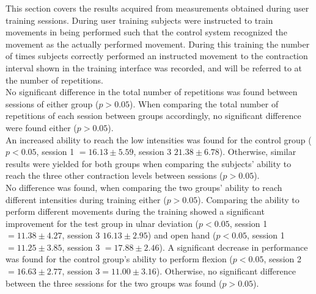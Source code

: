 \begin{multicols}{2}
This section covers the results acquired from measurements obtained during user training sessions. During user training subjects were instructed to train movements in being performed such that the control system recognized the movement as the actually performed movement. During this training the number of times subjects correctly performed an instructed movement to the contraction interval shown in the training interface was recorded, and will be referred to at the number of repetitions. \\
No significant difference in the total number of repetitions was found between sessions of either group ($p > 0.05$). When comparing the total number of repetitions of each session between groups accordingly, no significant difference were found either ($p > 0.05$). \\ %
An increased ability to reach the low intensities was found for the control group ($p < 0.05$, session 1 $ = 16.13 \pm 5.59$, session 3 $ 21.38 \pm 6.78$). Otherwise, similar results were yielded for both groups when comparing the subjects' ability to reach the three other contraction levels between sessions ($p > 0.05$).\\
No difference was found, when comparing the two groups' ability to reach different intensities during training either ($p > 0.05$).
Comparing the ability to perform different movements during the training showed a significant improvement for the test group in ulnar deviation ($p < 0.05$, session 1 $ = 11.38 \pm 4.27$, session 3 $ 16.13 \pm 2.95$) and open hand ($p < 0.05$, session 1 $ = 11.25 \pm 3.85$, session 3 $ = 17.88 \pm 2.46$). A significant decrease in performance was found for the control group's ability to perform flexion ($p < 0.05$, session 2$ = 16.63 \pm 2.77$, session 3$ = 11.00 \pm 3.16$). Otherwise, no significant difference between the three sessions for the two groups was found ($p > 0.05$).\\ %

\end{multicols}
